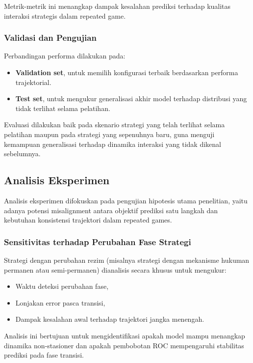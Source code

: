 Metrik-metrik ini menangkap dampak kesalahan prediksi terhadap kualitas interaksi strategis dalam repeated game.

\subsubsection{Validasi dan Pengujian}

Perbandingan performa dilakukan pada:

\begin{itemize}
    \item \textbf{Validation set}, untuk memilih konfigurasi terbaik berdasarkan performa trajektorial.
    \item \textbf{Test set}, untuk mengukur generalisasi akhir model terhadap distribusi yang tidak terlihat selama pelatihan.
\end{itemize}

Evaluasi dilakukan baik pada skenario strategi yang telah terlihat selama pelatihan maupun pada strategi yang sepenuhnya baru, guna menguji kemampuan generalisasi terhadap dinamika interaksi yang tidak dikenal sebelumnya.

\subsection{Analisis Eksperimen}

Analisis eksperimen difokuskan pada pengujian hipotesis utama penelitian, yaitu adanya potensi misalignment antara objektif prediksi satu langkah dan kebutuhan konsistensi trajektori dalam repeated games. 


\subsubsection{Sensitivitas terhadap Perubahan Fase Strategi}

Strategi dengan perubahan rezim (misalnya strategi dengan mekanisme hukuman permanen atau semi-permanen) dianalisis secara khusus untuk mengukur:

\begin{itemize}
    \item Waktu deteksi perubahan fase,
    \item Lonjakan error pasca transisi,
    \item Dampak kesalahan awal terhadap trajektori jangka menengah.
\end{itemize}

Analisis ini bertujuan untuk mengidentifikasi apakah model mampu menangkap dinamika non-stasioner dan apakah pembobotan ROC mempengaruhi stabilitas prediksi pada fase transisi.

